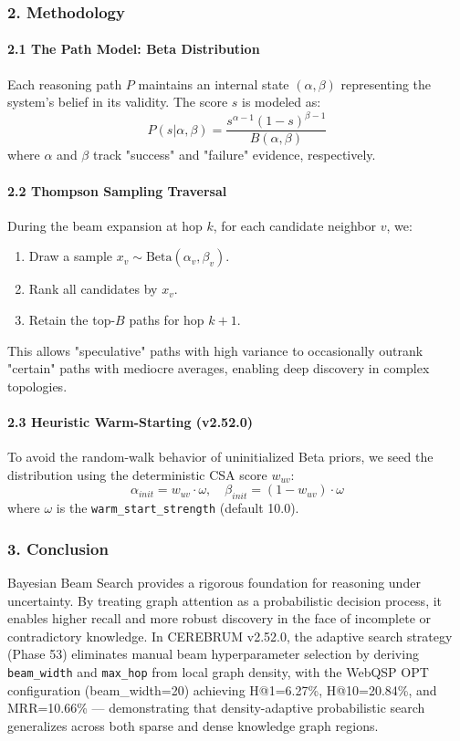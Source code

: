 \subsubsection{2. Methodology}

\paragraph{2.1 The Path Model: Beta Distri\-bution}
Each reasoning path $P$ maintains an internal state $(\alpha, \beta)$ repre\-senting the system's belief in its validity. The score $s$ is modeled as:
\begin{equation}
P(s | \alpha, \beta) = \frac{s^{\alpha-1} (1-s)^{\beta-1}}{B(\alpha, \beta)}
\end{equation}
where $\alpha$ and $\beta$ track "success" and "failure" evidence, respe\-ctively.

\paragraph{2.2 Thompson Sampling Traversal}
During the beam expansion at hop $k$, for each candidate neighbor $v$, we:
\begin{enumerate}
\item Draw a sample $x_v \sim \text{Beta}(\alpha_v, \beta_v)$.
\item Rank all candidates by $x_v$.
\item Retain the top-$B$ paths for hop $k+1$.

\end{enumerate}
This allows "speculative" paths with high variance to occas\-ionally outrank "certain" paths with mediocre averages, enabling deep discovery in complex topologies.

\paragraph{2.3 Heuristic Warm-Starting (v2.52.0)}
To avoid the random-walk behavior of unini\-tialized Beta priors, we seed the distr\-ibution using the deter\-ministic CSA score $w_{uv}$:
\begin{equation}
\alpha_{init} = w_{uv} \cdot \omega, \quad \beta_{init} = (1-w_{uv}) \cdot \omega
\end{equation}
where $\omega$ is the \texttt{warm\_start\_strength} (default 10.0).

\subsubsection{3. Conclusion}
Bayesian Beam Search provides a rigorous foundation for reasoning under uncertainty. By treating graph attention as a proba\-bilistic decision process, it enables higher recall and more robust discovery in the face of incomplete or contr\-adictory knowledge. In CEREBRUM v2.52.0, the adaptive search strategy (Phase 53) eliminates manual beam hyper\-parameter selection by deriving \texttt{beam\_width} and \texttt{max\_hop} from local graph density, with the WebQSP OPT confi\-guration (beam\_width=20) achieving H@1=6.27\%, H@10=20.84\%, and MRR=10.66\% — demon\-strating that density-adaptive proba\-bilistic search generalizes across both sparse and dense knowledge graph regions.

